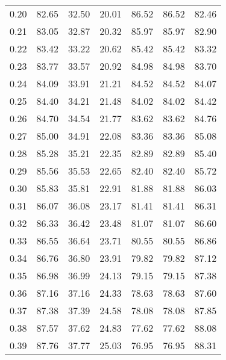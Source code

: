 \begin{tabular}{|c|c|c|c|c|c|c|}
      0.20 &     82.65 &     32.50 &      20.01 &   86.52 &      86.52 &         82.46 \\
      0.21 &     83.05 &     32.87 &      20.32 &   85.97 &      85.97 &         82.90 \\
      0.22 &     83.42 &     33.22 &      20.62 &   85.42 &      85.42 &         83.32 \\
      0.23 &     83.77 &     33.57 &      20.92 &   84.98 &      84.98 &         83.70 \\
      0.24 &     84.09 &     33.91 &      21.21 &   84.52 &      84.52 &         84.07 \\
      0.25 &     84.40 &     34.21 &      21.48 &   84.02 &      84.02 &         84.42 \\
      0.26 &     84.70 &     34.54 &      21.77 &   83.62 &      83.62 &         84.76 \\
      0.27 &     85.00 &     34.91 &      22.08 &   83.36 &      83.36 &         85.08 \\
      0.28 &     85.28 &     35.21 &      22.35 &   82.89 &      82.89 &         85.40 \\
      0.29 &     85.56 &     35.53 &      22.65 &   82.40 &      82.40 &         85.72 \\
      0.30 &     85.83 &     35.81 &      22.91 &   81.88 &      81.88 &         86.03 \\
      0.31 &     86.07 &     36.08 &      23.17 &   81.41 &      81.41 &         86.31 \\
      0.32 &     86.33 &     36.42 &      23.48 &   81.07 &      81.07 &         86.60 \\
      0.33 &     86.55 &     36.64 &      23.71 &   80.55 &      80.55 &         86.86 \\
      0.34 &     86.76 &     36.80 &      23.91 &   79.82 &      79.82 &         87.12 \\
      0.35 &     86.98 &     36.99 &      24.13 &   79.15 &      79.15 &         87.38 \\
      0.36 &     87.16 &     37.16 &      24.33 &   78.63 &      78.63 &         87.60 \\
      0.37 &     87.38 &     37.39 &      24.58 &   78.08 &      78.08 &         87.85 \\
      0.38 &     87.57 &     37.62 &      24.83 &   77.62 &      77.62 &         88.08 \\
      0.39 &     87.76 &     37.77 &      25.03 &   76.95 &      76.95 &         88.31 \\

\end{tabular}
